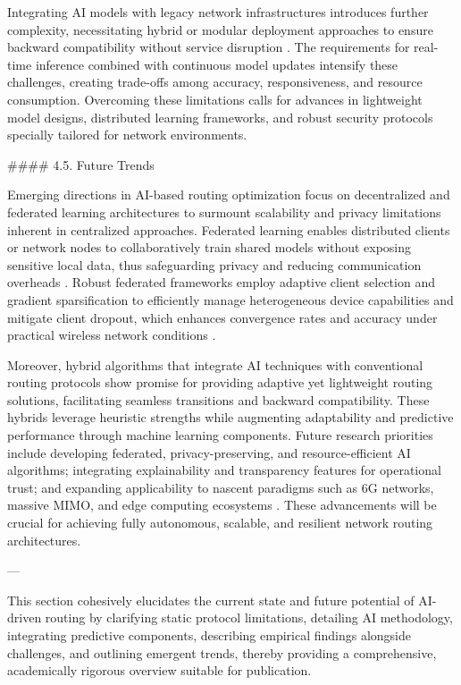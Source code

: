\documentclass[11pt]{article}
\begin{document}
\begin{itemize}
Integrating AI models with legacy network infrastructures introduces further complexity, necessitating hybrid or modular deployment approaches to ensure backward compatibility without service disruption \cite{ref48}. The requirements for real-time inference combined with continuous model updates intensify these challenges, creating trade-offs among accuracy, responsiveness, and resource consumption. Overcoming these limitations calls for advances in lightweight model designs, distributed learning frameworks, and robust security protocols specially tailored for network environments.

#### 4.5. Future Trends

Emerging directions in AI-based routing optimization focus on decentralized and federated learning architectures to surmount scalability and privacy limitations inherent in centralized approaches. Federated learning enables distributed clients or network nodes to collaboratively train shared models without exposing sensitive local data, thus safeguarding privacy and reducing communication overheads \cite{ref53}. Robust federated frameworks employ adaptive client selection and gradient sparsification to efficiently manage heterogeneous device capabilities and mitigate client dropout, which enhances convergence rates and accuracy under practical wireless network conditions \cite{ref49}.

Moreover, hybrid algorithms that integrate AI techniques with conventional routing protocols show promise for providing adaptive yet lightweight routing solutions, facilitating seamless transitions and backward compatibility. These hybrids leverage heuristic strengths while augmenting adaptability and predictive performance through machine learning components. Future research priorities include developing federated, privacy-preserving, and resource-efficient AI algorithms; integrating explainability and transparency features for operational trust; and expanding applicability to nascent paradigms such as 6G networks, massive MIMO, and edge computing ecosystems \cite{ref53}. These advancements will be crucial for achieving fully autonomous, scalable, and resilient network routing architectures.

---

This section cohesively elucidates the current state and future potential of AI-driven routing by clarifying static protocol limitations, detailing AI methodology, integrating predictive components, describing empirical findings alongside challenges, and outlining emergent trends, thereby providing a comprehensive, academically rigorous overview suitable for publication.


\end{itemize}
\end{document}
